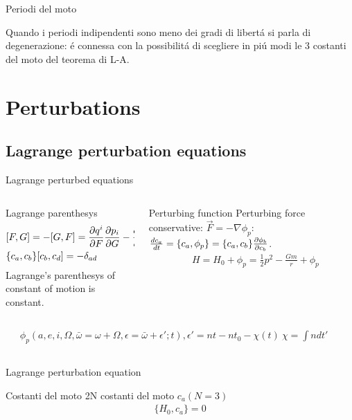 \begin{frame}{Periodi del moto}

Quando i periodi indipendenti sono meno dei gradi di libert\'a si parla di degenerazione: \'e connessa con la possibilit\'a di scegliere in pi\'u modi le 3 costanti del moto del teorema di L-A.

\end{frame}

\section{Perturbations}

\subsection{Lagrange perturbation equations}

\begin{frame}{Lagrange perturbed equations}
\begin{columns}[T]
\begin{column}{0.5\textwidth}
\begin{block}{Lagrange parenthesys}
\begin{align*}
&[F,G]=-[G,F]=\PDy{F}{q^i}\PDy{G}{p_i}-\PDy{G}{q^i}\PDy{F}{p^i}\\
&\{c_a,c_b\}[c_b,c_d]=-\delta_{ad}
\end{align*}
Lagrange's parenthesys of constant of motion is constant.
\end{block}
\end{column}\begin{column}{0.5\textwidth}
\begin{block}{Perturbing function}
Perturbing force conservative: $\vec{F}=-\nabla \phi_p$: $\TDy{t}{c_a}=\{c_a,\phi_p\}=\{c_a,c_b\}\PDy{c_b}{\phi_b}$.
\begin{align*}
&H=H_0+\phi_p=\frac{1}{2}p^2-\frac{Gm}{r}+\phi_p
\end{align*}
\end{block}
\end{column}\end{columns}
\begin{columns}[T]\begin{column}{0.5\textwidth}
\begin{align*}
&\phi_p(a,e,i,\Omega,\bar{\omega}=\omega+\Omega,\epsilon=\bar{\omega}+\epsilon';t), \epsilon'=nt-nt_0-\chi(t)\ \chi=\int ndt'
\end{align*}
\end{column}
\begin{column}{0.5\textwidth}
\end{column}\end{columns}
\end{frame}


\begin{wordonframe}{Lagrange perturbation equation}
\begin{block}{Costanti del moto}
2N costanti del moto $c_a (N=3)$
\begin{align*}
\{H_0,c_a\}=0
\end{align*}
\end{block}

\end{wordonframe}


